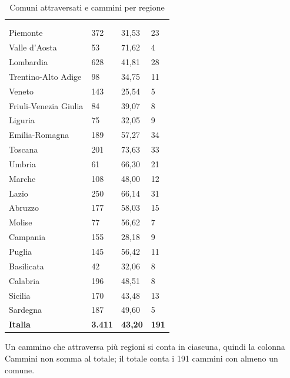 \FloatBarrier
\begin{tabella}
\begin{xltabular}{\linewidth}{|L|R{2.6cm}|R{3.2cm}|R{2.2cm}|}
\caption{Comuni attraversati e cammini per regione}\label{tab:regioni}\\
\hline
{} &  &  & \\ \hline
\endfirsthead
\hline
{} &  &  & \\ \hline
\endhead
Piemonte & 372 & 31,53 & 23\\ \hline
Valle d'Aosta & 53 & 71,62 & 4\\ \hline
Lombardia & 628 & 41,81 & 28\\ \hline
Trentino-Alto Adige & 98 & 34,75 & 11\\ \hline
Veneto & 143 & 25,54 & 5\\ \hline
Friuli-Venezia Giulia & 84 & 39,07 & 8\\ \hline
Liguria & 75 & 32,05 & 9\\ \hline
Emilia-Romagna & 189 & 57,27 & 34\\ \hline
Toscana & 201 & 73,63 & 33\\ \hline
Umbria & 61 & 66,30 & 21\\ \hline
Marche & 108 & 48,00 & 12\\ \hline
Lazio & 250 & 66,14 & 31\\ \hline
Abruzzo & 177 & 58,03 & 15\\ \hline
Molise & 77 & 56,62 & 7\\ \hline
Campania & 155 & 28,18 & 9\\ \hline
Puglia & 145 & 56,42 & 11\\ \hline
Basilicata & 42 & 32,06 & 8\\ \hline
Calabria & 196 & 48,51 & 8\\ \hline
Sicilia & 170 & 43,48 & 13\\ \hline
Sardegna & 187 & 49,60 & 5\\ \hline
{}\textbf{Italia} & \textbf{3.411} & \textbf{43,20} & \textbf{191}\\ \hline
\end{xltabular}
\end{tabella}
\par\vspace{2pt}\footnotesize Un cammino che attraversa più regioni si conta in ciascuna, quindi la colonna Cammini non somma al totale; il totale conta i 191 cammini con almeno un comune.\par\normalsize


